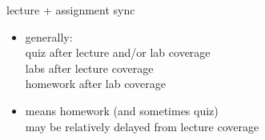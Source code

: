 \begin{frame}{lecture + assignment sync}
    \begin{itemize}
    \item generally: \\
          quiz after lecture and/or lab coverage \\
          labs after lecture coverage \\
          homework after lab coverage 
    \vspace{.5cm}
    \item means homework (and sometimes quiz) \\
          may be relatively delayed from lecture coverage
    \end{itemize}
\end{frame}
